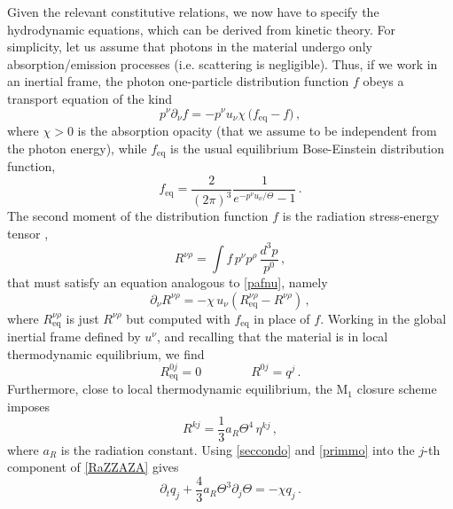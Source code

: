 \documentclass[a4paper, amsfonts, amssymb, amsmath, reprint, twocolumn, showkeys, nofootinbib]{revtex4-2}
\begin{document}
Given the relevant constitutive relations, we now have to specify the hydrodynamic equations, which can be derived from kinetic theory. For simplicity, let us assume that photons in the material undergo only absorption/emission processes (i.e. scattering is negligible). Thus, if we work in an inertial frame, the photon one-particle distribution function $f$ obeys a  transport equation of the kind \citep{AndersonWitting1974,cercignani_book,UdeyIsrael1982}
\begin{equation}\label{pafnu}
p^\nu \partial_\nu f = -p^\nu u_\nu \chi \, \big(f_{\text{eq}}-f \big) \, ,
\end{equation}
where $\chi>0$ is the absorption opacity (that we assume to be independent from the photon energy), while $f_{\text{eq}}$ is the usual equilibrium Bose-Einstein distribution function, 
\begin{equation}\label{BoseEinstein}
f_{\text{eq}} =\dfrac{2}{(2\pi)^3} \dfrac{1}{e^{-p^\nu u_\nu/\Theta}-1} \, .
\end{equation}
The second moment of the distribution function $f$ is the radiation stress-energy tensor \citep{Groot1980RelativisticKT},
\begin{equation}\label{ventinove}
R^{\nu \rho} = \int f \, p^\nu p^\rho \, \dfrac{d^3 p}{p^0} \, ,
\end{equation}
that must satisfy an equation analogous to \eqref{pafnu}, namely
\begin{equation}\label{RaZZAZA}
\partial_\nu R^{\nu \rho} = -\chi \, u_\nu (R^{\nu \rho}_{\text{eq}}-R^{\nu \rho}) \, ,
\end{equation}
where $R^{\nu \rho}_{\text{eq}}$ is just $R^{\nu \rho}$  but computed  with $f_{\text{eq}}$ in place of $f$. Working in the global inertial frame defined by $u^\nu$, and recalling that the material is in local thermodynamic equilibrium, we find
\begin{equation}\label{seccondo}
R^{0 j}_{\text{eq}} =0   \quad \quad  \quad \quad    R^{0j}=q^j \, .
\end{equation}  
Furthermore, close to local thermodynamic equilibrium, the  $\text{M}_1$  closure scheme imposes \citep{GavassinoRadiazione}
\begin{equation}\label{primmo}
R^{kj}=\dfrac{1}{3} a_R  \Theta^4 \, \eta^{kj} \, ,
\end{equation}
where $a_R$ is the radiation constant. Using \eqref{seccondo} and \eqref{primmo} into the $j$-th component of \eqref{RaZZAZA} gives 
\begin{equation}
\partial_t q_j + \dfrac{4}{3} a_R \Theta^3 \partial_j \Theta = -\chi q_j \, .
\end{equation} 
\end{document}

